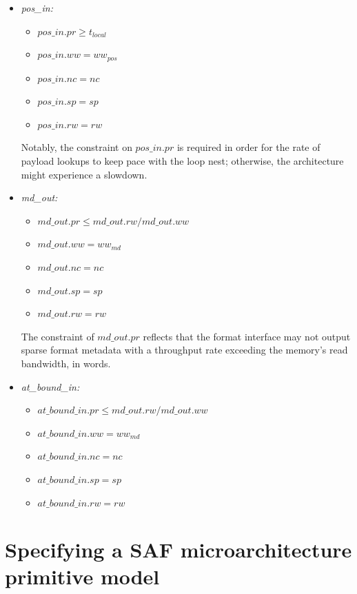 \begin{itemize}
    \item \textit{pos\_in:} 
    \begin{itemize}
        \item $pos\_in.pr \geq t_{local}$
        \item $pos\_in.ww = ww_{pos}$
        \item $pos\_in.nc = nc$
        \item $pos\_in.sp = sp$
        \item $pos\_in.rw = rw$
    \end{itemize}

    Notably, the constraint on $pos\_in.pr$ is required in order for the rate of payload lookups to keep pace with the loop nest; otherwise, the architecture might experience a slowdown.
    
    \item \textit{md\_out:} 

    \begin{itemize}
        \item $md\_out.pr \leq md\_out.rw/md\_out.ww$
        \item $md\_out.ww = ww_{md}$
        \item $md\_out.nc = nc$
        \item $md\_out.sp = sp$
        \item $md\_out.rw = rw$
    \end{itemize}

    The constraint of $md\_out.pr$ reflects that the format interface may not output sparse format metadata with a throughput rate exceeding the memory's read bandwidth, in words.

    \item \textit{at\_bound\_in:} 

    \begin{itemize}
        \item $at\_bound\_in.pr \leq md\_out.rw/md\_out.ww$
        \item $at\_bound\_in.ww = ww_{md}$
        \item $at\_bound\_in.nc = nc$
        \item $at\_bound\_in.sp = sp$
        \item $at\_bound\_in.rw = rw$
    \end{itemize}
\end{itemize}

\section{Specifying a SAF microarchitecture primitive model}

